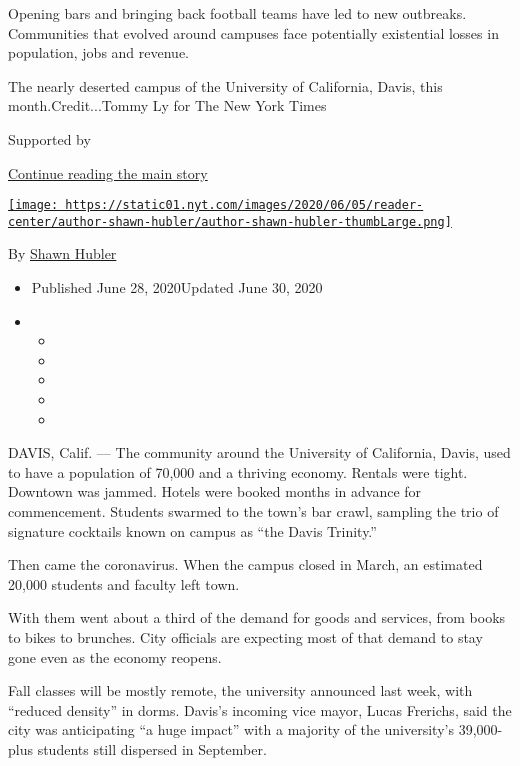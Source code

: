 Opening bars and bringing back football teams have led to new outbreaks.
Communities that evolved around campuses face potentially existential
losses in population, jobs and revenue.

The nearly deserted campus of the University of California, Davis, this
month.Credit...Tommy Ly for The New York Times

Supported by

\protect\hyperlink{after-sponsor}{Continue reading the main story}

\href{https://www.nytimes.com/by/shawn-hubler}{\texttt{[image: https://static01.nyt.com/images/2020/06/05/reader-center/author-shawn-hubler/author-shawn-hubler-thumbLarge.png]}}

By \href{https://www.nytimes.com/by/shawn-hubler}{Shawn Hubler}

\begin{itemize}
\item
  Published June 28, 2020Updated June 30, 2020
\item
  \begin{itemize}
  \item
  \item
  \item
  \item
  \item
  \end{itemize}
\end{itemize}

DAVIS, Calif. --- The community around the University of California,
Davis, used to have a population of 70,000 and a thriving economy.
Rentals were tight. Downtown was jammed. Hotels were booked months in
advance for commencement. Students swarmed to the town's bar crawl,
sampling the trio of signature cocktails known on campus as ``the Davis
Trinity.''

Then came the coronavirus. When the campus closed in March, an estimated
20,000 students and faculty left town.

With them went about a third of the demand for goods and services, from
books to bikes to brunches. City officials are expecting most of that
demand to stay gone even as the economy reopens.

Fall classes will be mostly remote, the university announced last week,
with ``reduced density'' in dorms. Davis's incoming vice mayor, Lucas
Frerichs, said the city was anticipating ``a huge impact'' with a
majority of the university's 39,000-plus students still dispersed in
September.

